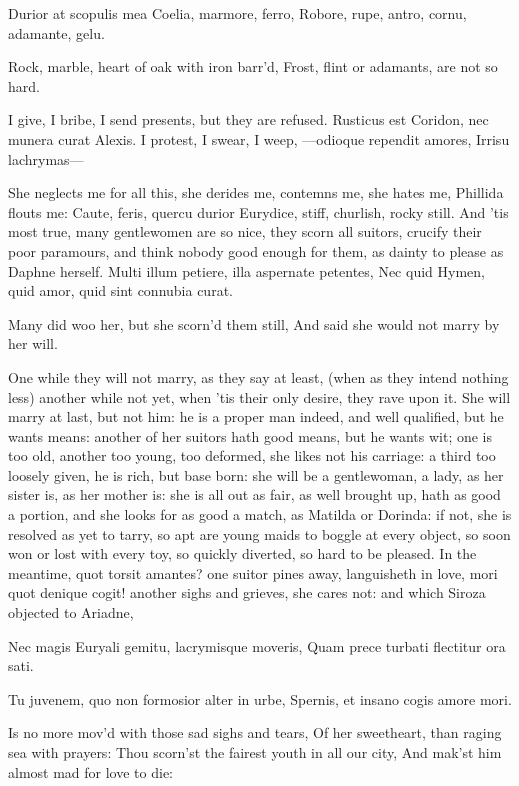 {Durior at scopulis mea Coelia, marmore, ferro,
Robore, rupe, antro, cornu, adamante, gelu.

Rock, marble, heart of oak with iron barr'd,
Frost, flint or adamants, are not so hard.

I give, I bribe, I send presents, but they are refused. Rusticus
est Coridon, nec munera curat Alexis. I protest, I swear, I weep,
 ---odioque rependit amores,
Irrisu lachrymas---

She neglects me for all this, she derides me, contemns me, she hates
me, Phillida flouts me: Caute, feris, quercu durior Eurydice, stiff,
churlish, rocky still.
And 'tis most true, many gentlewomen are so nice, they scorn all
suitors, crucify their poor paramours, and think nobody good enough for
them, as dainty to please as Daphne herself.
Multi illum petiere, illa aspernate petentes,
Nec quid Hymen, quid amor, quid sint connubia curat.

Many did woo her, but she scorn'd them still,
And said she would not marry by her will.

One while they will not marry, as they say at least, (when as they
intend nothing less) another while not yet, when 'tis their only
desire, they rave upon it. She will marry at last, but not him: he is a
proper man indeed, and well qualified, but he wants means: another of
her suitors hath good means, but he wants wit; one is too old, another
too young, too deformed, she likes not his carriage: a third too
loosely given, he is rich, but base born: she will be a gentlewoman, a
lady, as her sister is, as her mother is: she is all out as fair, as
well brought up, hath as good a portion, and she looks for as good a
match, as Matilda or Dorinda: if not, she is resolved as yet to tarry,
so apt are young maids to boggle at every object, so soon won or lost
with every toy, so quickly diverted, so hard to be pleased. In the
meantime, quot torsit amantes? one suitor pines away, languisheth in
love, mori quot denique cogit! another sighs and grieves, she cares
not: and which Siroza objected to Ariadne,

Nec magis Euryali gemitu, lacrymisque moveris,
Quam prece turbati flectitur ora sati.

Tu juvenem, quo non formosior alter in urbe,
Spernis, et insano cogis amore mori.


Is no more mov'd with those sad sighs and tears,
Of her sweetheart, than raging sea with prayers:
Thou scorn'st the fairest youth in all our city,
And mak'st him almost mad for love to die:

}
